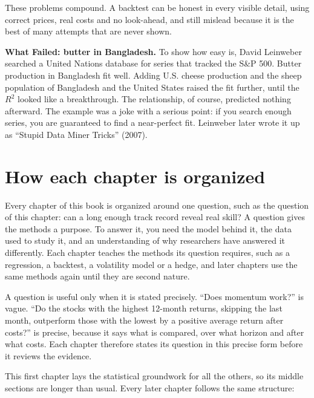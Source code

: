 These problems compound. A backtest can be honest in every visible detail, using correct prices, real costs and no look-ahead, and still mislead because it is the best of many attempts that are never shown.

\begin{callout}
\textbf{What Failed: butter in Bangladesh.} To show how easy  is, David Leinweber searched a United Nations database for series that tracked the S\&P 500. Butter production in Bangladesh fit well. Adding U.S. cheese production and the sheep population of Bangladesh and the United States raised the fit further, until the $R^2$ looked like a breakthrough. The relationship, of course, predicted nothing afterward. The example was a joke with a serious point: if you search enough series, you are guaranteed to find a near-perfect fit. Leinweber later wrote it up as ``Stupid Data Miner Tricks'' (2007).
\end{callout}

\section{How each chapter is organized}
\label{sec:01-method}

Every chapter of this book is organized around one question, such as the question of this chapter: can a long enough track record reveal real skill? A question gives the methods a purpose. To answer it, you need the model behind it, the data used to study it, and an understanding of why researchers have answered it differently. Each chapter teaches the methods its question requires, such as a regression, a backtest, a volatility model or a hedge, and later chapters use the same methods again until they are second nature.

A question is useful only when it is stated precisely. ``Does momentum work?'' is vague. ``Do the stocks with the highest 12-month returns, skipping the last month, outperform those with the lowest by a positive average return after costs?'' is precise, because it says what is compared, over what horizon and after what costs. Each chapter therefore states its question in this precise form before it reviews the evidence.

This first chapter lays the statistical groundwork for all the others, so its middle sections are longer than usual. Every later chapter follows the same structure:

